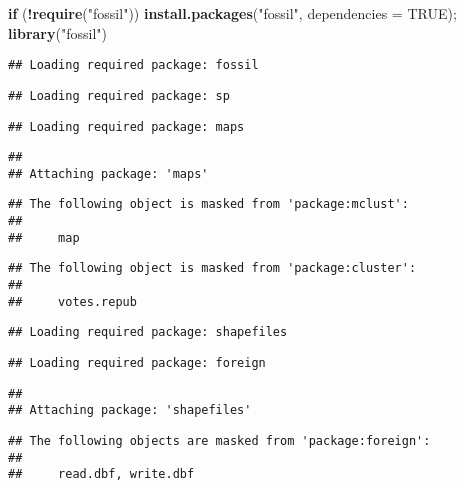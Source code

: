 \documentclass[
]{article}
\newenvironment{Shaded}{\begin{snugshade}}{\end{snugshade}}
\newcommand{\AttributeTok}[1]{\textcolor[rgb]{0.13,0.29,0.53}{#1}}
\newcommand{\ConstantTok}[1]{\textcolor[rgb]{0.56,0.35,0.01}{#1}}
\newcommand{\ControlFlowTok}[1]{\textcolor[rgb]{0.13,0.29,0.53}{\textbf{#1}}}
\newcommand{\FunctionTok}[1]{\textcolor[rgb]{0.13,0.29,0.53}{\textbf{#1}}}
\newcommand{\NormalTok}[1]{#1}
\newcommand{\SpecialCharTok}[1]{\textcolor[rgb]{0.81,0.36,0.00}{\textbf{#1}}}
\newcommand{\StringTok}[1]{\textcolor[rgb]{0.31,0.60,0.02}{#1}}
\begin{document}
\begin{Shaded}
\begin{Highlighting}[]
\ControlFlowTok{if}\NormalTok{ (}\SpecialCharTok{!}\FunctionTok{require}\NormalTok{(}\StringTok{"fossil"}\NormalTok{)) }\FunctionTok{install.packages}\NormalTok{(}\StringTok{"fossil"}\NormalTok{, }\AttributeTok{dependencies =} \ConstantTok{TRUE}\NormalTok{); }\FunctionTok{library}\NormalTok{(}\StringTok{"fossil"}\NormalTok{)}
\end{Highlighting}
\end{Shaded}

\begin{verbatim}
## Loading required package: fossil
\end{verbatim}

\begin{verbatim}
## Loading required package: sp
\end{verbatim}

\begin{verbatim}
## Loading required package: maps
\end{verbatim}

\begin{verbatim}
## 
## Attaching package: 'maps'
\end{verbatim}

\begin{verbatim}
## The following object is masked from 'package:mclust':
## 
##     map
\end{verbatim}

\begin{verbatim}
## The following object is masked from 'package:cluster':
## 
##     votes.repub
\end{verbatim}

\begin{verbatim}
## Loading required package: shapefiles
\end{verbatim}

\begin{verbatim}
## Loading required package: foreign
\end{verbatim}

\begin{verbatim}
## 
## Attaching package: 'shapefiles'
\end{verbatim}

\begin{verbatim}
## The following objects are masked from 'package:foreign':
## 
##     read.dbf, write.dbf
\end{verbatim}
\end{document}
